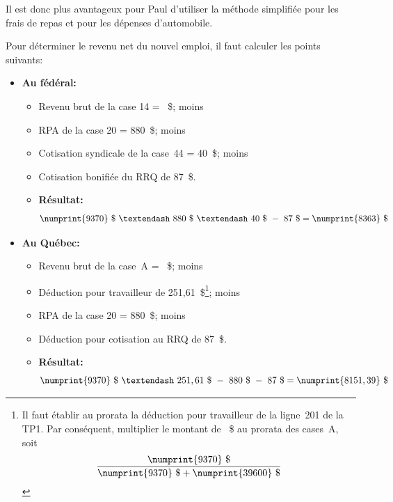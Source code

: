 Il est donc plus avantageux pour Paul d'utiliser la méthode simplifiée pour les frais de repas et pour les dépenses d'automobile.

Pour déterminer le revenu net du nouvel emploi, il faut calculer les points suivants:
\begin{itemize}
	\item \textbf{Au fédéral:}
	\begin{itemize}
		\item Revenu brut de la case 14 = ~\$;  moins
		\item RPA de la case 20 = 880~\$;  moins
		\item Cotisation syndicale de la case~44 = 40~\$;  moins
		\item Cotisation bonifiée du RRQ de 87~\$. 
		\item \textbf{Résultat:} \[ \numprint{9370}~\$~–~880~\$~–~40~\$~-~87~\$ = \numprint{8 363}~\$ \]
	\end{itemize}
	\item \textbf{Au Québec:}
	\begin{itemize}
		\item Revenu brut de la case~A = ~\$;  moins
		\item Déduction pour travailleur de 251,61~\$\footnote{Il faut établir au prorata la déduction pour travailleur de la ligne~201 de la TP1. Par conséquent, multiplier le montant de ~\$ au prorata des cases~A, soit \[ \frac{\numprint{9370}~\$}{\numprint{9370}~\$ + \numprint{39600}~\$} \]};  moins                                                                                                                               
		\item RPA de la case 20 = 880~\$;  moins
		\item Déduction pour cotisation au RRQ de 87~\$. 
		\item \textbf{Résultat:} \[ \numprint{9370}~\$~–~251,61~\$~-~880~\$~-~87~\$ = \numprint{8151,39}~\$ \]
	\end{itemize}
\end{itemize}


